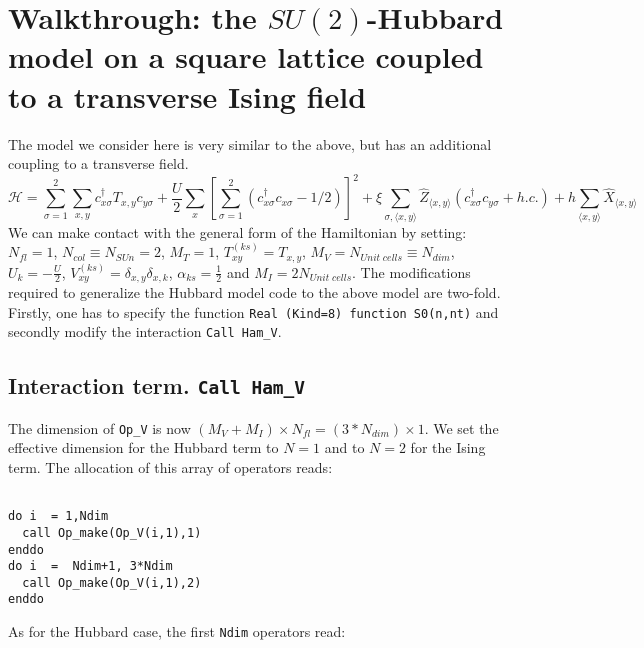 \section{Walkthrough: the $SU(2)$-Hubbard model on a square lattice coupled to a transverse Ising field}




The model we consider here  is very similar to the  above,  but has an additional coupling to a transverse field. 
\begin{equation}
\label{eqn_hubbard_sun_Ising}
\mathcal{H}=
\sum\limits_{\sigma=1}^{2} 
\sum\limits_{x,y } 
  c^{\dagger}_{x \sigma} T_{x,y}c^{\phantom\dagger}_{y \sigma} 
+ \frac{U}{2}\sum\limits_{x}\left[
\sum\limits_{\sigma=1}^{2}
\left(  c^{\dagger}_{x \sigma} c^{\phantom\dagger}_{x \sigma}  -1/2 \right) \right]^{2}   
+  \xi \sum_{\sigma,\langle x,y \rangle} \hat{Z}_{\langle x,y \rangle}  \left( c^{\dagger}_{x \sigma} c^{\phantom\dagger}_{y \sigma}  + h.c. \right) + h \sum_{\langle x,y \rangle} \hat{X}_{\langle x,y \rangle}
\end{equation}
We can make contact with the general form of the Hamiltonian by setting: 
$N_{fl} = 1$, $N_{col} \equiv N_{SUn}     =2 $,   $M_T    =    1$,  $T^{(ks)}_{x y}   =  T_{x,y}$,  $M_V   =  N_{Unit\; cells} \equiv N_{dim}$,  $U_{k}       =   -\frac{U}{2}$, 
 $V_{x y}^{(ks)} =  \delta_{x,y} \delta_{x,k}$,  $\alpha_{ks}   =  \frac{1}{2}  $ and $M_I       = 2 N_{Unit\; cells} $.
The modifications  required to generalize the Hubbard model code to the above model are two-fold.  Firstly, one has to specify the function \texttt{Real (Kind=8) function S0(n,nt)} and  secondly  modify the interaction \texttt{Call Ham\_V}.


\subsection{Interaction term. \texttt{Call Ham\_V}}
The dimension of   \texttt{Op\_V}  is now  $(M_V + M_I)\times N_{fl}=(3*N_{dim}) \times 1$. 
We set the effective dimension  for the Hubbard term to  $N=1$  and to  $N=2$ for the Ising term. The allocation of this array of operators reads: 

\begin{lstlisting}

do i  = 1,Ndim
  call Op_make(Op_V(i,1),1)
enddo
do i  =  Ndim+1, 3*Ndim
  call Op_make(Op_V(i,1),2)
enddo

\end{lstlisting}
As for the Hubbard case, the first \texttt{Ndim}  operators read: 

